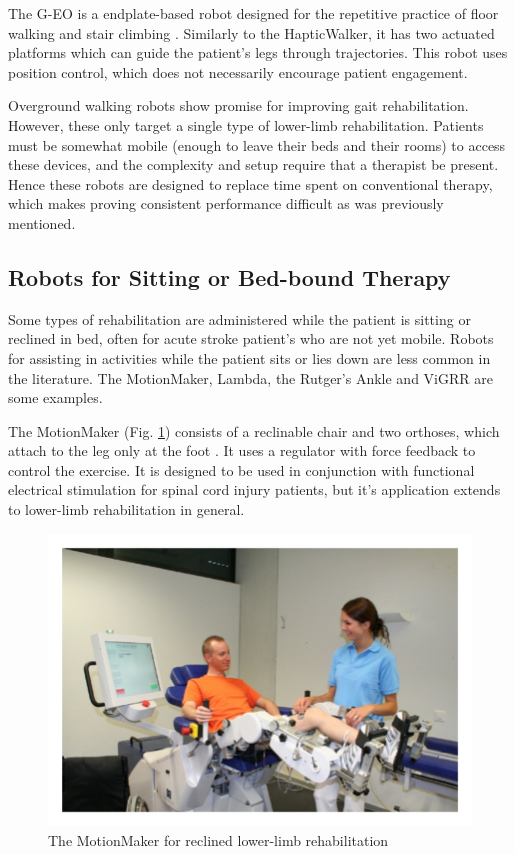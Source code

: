 \documentclass[12pt]{report}
\begin{document}
	The G-EO is a endplate-based robot designed for the repetitive practice of floor walking and stair climbing \cite{Hesse2010}. Similarly to the HapticWalker, it has two actuated platforms which can guide the patient's legs through trajectories. This robot uses position control, which does not necessarily encourage patient engagement. 
	
	
	Overground walking robots show promise for improving gait rehabilitation. However, these only target a single type of lower-limb rehabilitation. Patients must be somewhat mobile (enough to leave their beds and their rooms) to access these devices, and the complexity and setup require that a therapist be present. Hence these robots are designed to replace time spent on conventional therapy, which makes proving consistent performance difficult as was previously mentioned. 
	
	\subsection{Robots for Sitting or Bed-bound Therapy}
	
	Some types of rehabilitation are administered while the patient is sitting or reclined in bed, often for acute stroke patient's who are not yet mobile. Robots for assisting in activities while the patient sits or lies down are less common in the literature. The MotionMaker, Lambda, the Rutger's Ankle and ViGRR are some examples. 
	
	The MotionMaker (Fig. \ref{fig:Motionmaker}) consists of a reclinable chair and two orthoses, which attach to the leg only at the foot \cite{Schmitt2004}. It uses a regulator with force feedback to control the exercise. It is designed to be used in conjunction with functional electrical stimulation for spinal cord injury patients, but it's application extends to lower-limb rehabilitation in general. 
	
	\begin{figure}[h] 
		\centering
		\includegraphics[width=0.75\linewidth]{Motionmaker}
		\caption{The MotionMaker for reclined lower-limb rehabilitation}
		\label{fig:Motionmaker}
	\end{figure}
	
\end{document}
